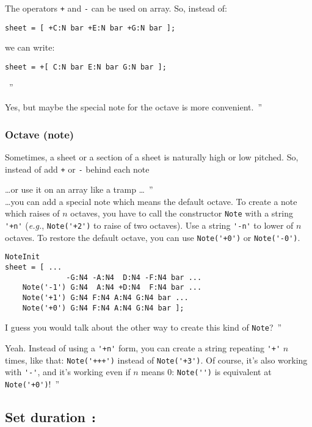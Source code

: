\documentclass{article}
\newcommand{\note}{\lstinline!Note!\xspace}
\newcommand{\eg}{\emph{e.g.}\xspace}
\newenvironment{meenv}{ \par \noindent \makebox[6em][r]{ \textcolor{mecolor}{Me}: `` --~}}{~''}
\newenvironment{myselfenv}{ \par \noindent \makebox[6em][r]{ \textcolor{myselfcolor}{Myself}: `` --~}}{~''}
\newcommand{\me}[1]{\begin{meenv}#1\end{meenv}}
\newcommand{\myself}[1]{\begin{myselfenv}#1\end{myselfenv}}
\begin{document}
\begin{meenv}%
The operators \lstinline!+! and \lstinline!-! can be used on array. So, instead of:
\begin{lstlisting}
sheet = [ +C:N bar +E:N bar +G:N bar ];
\end{lstlisting}
we can write:
\begin{lstlisting}
sheet = +[ C:N bar E:N bar G:N bar ];
\end{lstlisting}%
\end{meenv}
\myself{Yes, but maybe the special note for the octave is more convenient.}

\subsubsection{Octave (note)}
\label{sec:OctaveNote}

Sometimes, a sheet or a section of a sheet is naturally high or low pitched. So, instead of add \lstinline!+! or \lstinline!-! behind each note
\myself{\dots or use it on an array like a tramp \dots} \\
\dots you can add a special note which means the default octave. To create a note which raises of $n$ octaves, you have to call the constructor \note with a string \lstinline!'+n'! (\eg, \lstinline!Note('+2')! to raise of two octaves). Use a string \lstinline!'-n'! to lower of $n$ octaves. To restore the default octave, you can use \lstinline!Note('+0')! or \lstinline!Note('-0')!. \\

\begin{lstlisting}
NoteInit
sheet = [ ...
	          -G:N4 -A:N4  D:N4 -F:N4 bar ...
	Note('-1') G:N4  A:N4 +D:N4  F:N4 bar ...
	Note('+1') G:N4 F:N4 A:N4 G:N4 bar ...
	Note('+0') G:N4 F:N4 A:N4 G:N4 bar ];
\end{lstlisting}

\myself{I guess you would talk about the other way to create this kind of \note?}
\me{Yeah. Instead of using a \lstinline!'+n'! form, you can create a string repeating \lstinline!'+'! $n$ times, like that: \lstinline!Note('+++')! instead of \lstinline!Note('+3')!. Of course, it's also working with \lstinline!'-'!, and it's working even if $n$ means $0$: \lstinline!Note('')! is equivalent at \lstinline!Note('+0')!!}

\subsection{Set duration \lstinline!:!}
\label{sec:SetDuration}
\end{document}
